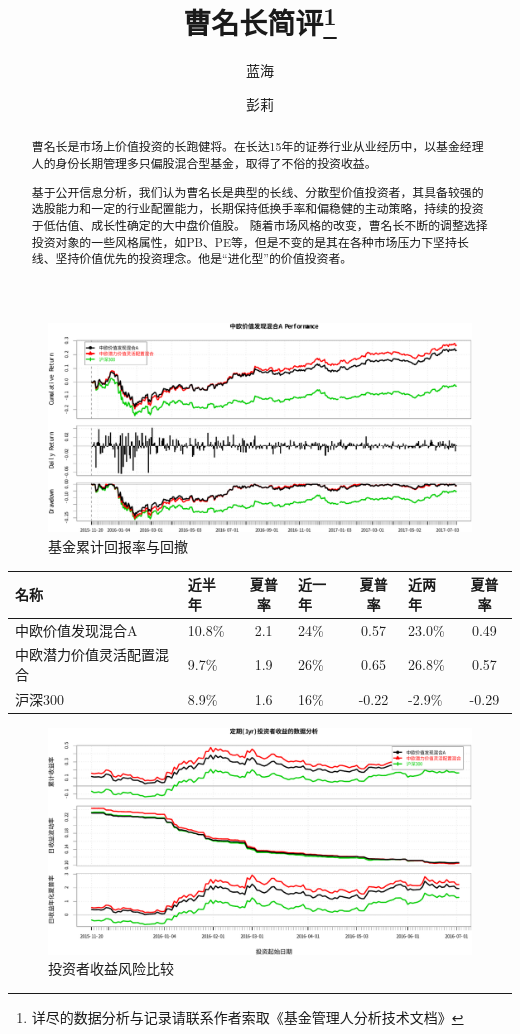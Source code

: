 \documentclass[journal=jacsat,manuscript=article]{achemso}
\author{蓝海}
\author{彭莉}
\title[曹名长]{曹名长简评\footnote{详尽的数据分析与记录请联系作者索取《基金管理人分析技术文档》}}
\begin{document}
\begin{abstract}
曹名长是市场上价值投资的长跑健将。在长达15年的证券行业从业经历中，以基金经理人的身份长期管理多只偏股混合型基金，取得了不俗的投资收益。

基于公开信息分析，我们认为曹名长是典型的长线、分散型价值投资者，其具备较强的选股能力和一定的行业配置能力，长期保持低换手率和偏稳健的主动策略，持续的投资于低估值、成长性确定的大中盘价值股。
随着市场风格的改变，曹名长不断的调整选择投资对象的一些风格属性，如PB、PE等，但是不变的是其在各种市场压力下坚持长线、坚持价值优先的投资理念。他是``进化型''的价值投资者。
\end{abstract}
\begin{figure}[htbp]
\centering
\includegraphics[width=15cm]{cmc-review_files/figure-latex/unnamed-chunk-1-1.pdf}
\caption{基金累计回报率与回撤}
\end{figure}

\begin{longtable}[]{@{}llclclc@{}}
\toprule
名称 & 近半年 & 夏普率 & 近一年 & 夏普率 & 近两年 &
夏普率\tabularnewline
\midrule
\endhead
中欧价值发现混合A & 10.8\% & 2.1 & 24\% & 0.57 & 23.0\% &
0.49\tabularnewline
中欧潜力价值灵活配置混合 & 9.7\% & 1.9 & 26\% & 0.65 & 26.8\% &
0.57\tabularnewline
沪深300 & 8.9\% & 1.6 & 16\% & -0.22 & -2.9\% & -0.29\tabularnewline
\bottomrule
\end{longtable}

\begin{figure}[htbp]
\centering
\includegraphics[width=15cm]{cmc-review_files/figure-latex/unnamed-chunk-2-1.pdf}
\caption{投资者收益风险比较}
\end{figure}
\end{document}
